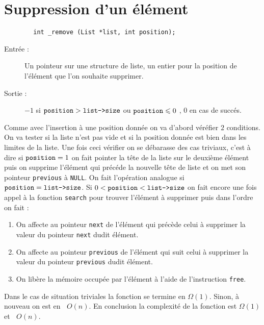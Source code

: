 \documentclass[a4paper, 12pt, leqno]{report}
\theoremstyle{plain}
\newcommand{\bigO}[1]{\ensuremath{\mathop{}\mathopen{}O\mathopen{}\left(#1\right)}}
\begin{document}
        \newpage    
            
        \section{Suppression d'un élément}
           \begin{verbatim}
        int _remove (List *list, int position);
           \end{verbatim}
            \begin{description}
            \item[Entrée :] Un pointeur sur une structure de liste, un entier pour la position de l'élément que l'on souhaite supprimer.
            \item[Sortie :] $-1$ si $\verb+position+ > \verb+list->size+$ ou $\verb+position+ \leqslant 0$ , $0$ en cas de succés.
            \end{description}  
            Comme avec l'insertion à une position donnée on va d'abord véréfier $2$ conditions. On va tester si la liste n'est pas vide et si la position donnée est bien dans les limites de la liste. Une fois ceci vérifier on se débarasse des cas triviaux, c'est à dire si $\verb+position+ = 1$ on fait pointer la tête de la liste sur le deuxième élément puis on supprime l'élément qui précéde la nouvelle tête de liste et on met son pointeur \verb+previous+ à \verb+NULL+. On fait l'opération analogue si $\verb+position+ = \verb+list->size+$. Si $0<\verb+position+<\verb+list->size+$ on fait encore une fois appel à la fonction \verb+search+ pour trouver l'élément à supprimer puis dans l'ordre on fait :
            \begin{enumerate}
            \item On affecte au pointeur \verb+next+ de l'élément qui précède celui à supprimer la valeur du pointeur \verb+next+ dudit élément.
            \item On affecte au pointeur \verb+previous+ de l'élément qui suit celui à supprimer la valeur du pointeur \verb+previous+ dudit élément.
            \item On libère la mémoire occupée par l'élément à l'aide de l'instruction \verb+free+.
            \end{enumerate}
            Dans le cas de situation triviales la fonction se termine en $\Omega(1)$. Sinon, à nouveau on est en $\bigO{n}$. En conclusion la complexité de la fonction est $\Omega(1)$ et $\bigO{n}$.
            
            
\end{document}
